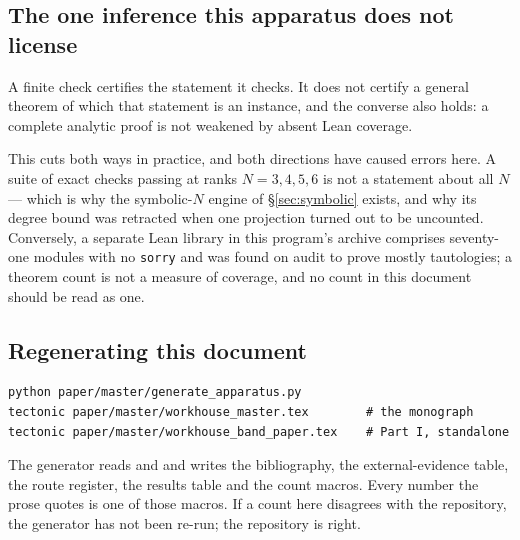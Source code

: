 \subsection{The one inference this apparatus does not license}

A finite check certifies the statement it checks. It does not certify a
general theorem of which that statement is an instance, and the converse
also holds: a complete analytic proof is not weakened by absent Lean
coverage.

This cuts both ways in practice, and both directions have caused errors
here. A suite of exact checks passing at ranks $N = 3, 4, 5, 6$ is not a
statement about all $N$ --- which is why the symbolic-$N$ engine of
\S\ref{sec:symbolic} exists, and why its degree bound was retracted when
one projection turned out to be uncounted. Conversely, a separate Lean
library in this program's archive comprises seventy-one modules with no
\texttt{sorry} and was found on audit to prove mostly tautologies; a
theorem count is not a measure of coverage, and no count in this
document should be read as one.

\subsection{Regenerating this document}

\begin{verbatim}
python paper/master/generate_apparatus.py
tectonic paper/master/workhouse_master.tex        # the monograph
tectonic paper/master/workhouse_band_paper.tex    # Part I, standalone
\end{verbatim}

The generator reads  and
 and writes
the bibliography, the external-evidence table, the route register, the
results table and the count macros. Every number the prose quotes is one
of those macros. If a count here disagrees with the repository, the
generator has not been re-run; the repository is right.

